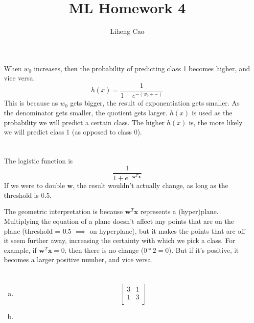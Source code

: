 \documentclass[12pt]{article}
\title{ML Homework 4}
\author{Liheng Cao}
\begin{document}
\maketitle

\section{}
When $ w_0 $ increases, then the probability of predicting class 1 becomes higher, and vice versa. 
\[ h(x) = \dfrac{1}{1+e^{-(w_0 + \cdots)}} \]
This is because as $ w_0 $ gets bigger, the result of exponentiation gets smaller. As the denominator gets smaller, the quotient gets larger. $ h(x) $ is used as the probability we will predict a certain class. The higher $ h(x) $ is, the more likely we will predict class 1 (as opposed to class 0).
\newpage

\section{}
The logistic function is \[ \dfrac{1}{1+e^{-\textbf{w}^T \textbf{x}}} \]
If we were to double $ \textbf{w} $, the result wouldn't actually change, as long as the threshold is 0.5. 

The geometric interpretation is because $ \textbf{w}^T\textbf{x} $ represents a (hyper)plane. Multiplying the equation of a plane doesn't affect any points that are on the plane (threshold = 0.5 $\implies$ on hyperplane), but it makes the points that are off it seem further away, increasing the certainty with which we pick a class. For example, if $ \textbf{w}^T\textbf{x} = 0$, then there is no change ($ 0 * 2 = 0 $). But if it's positive, it becomes a larger positive number, and vice versa.
\newpage

\section{}
\begin{enumerate}[(a)]
	\item 
	\[\begin{bmatrix}
		3 & 1 \\
		1 & 3 \\
	\end{bmatrix}\]
	
	\item 
\end{enumerate}
\end{document}
